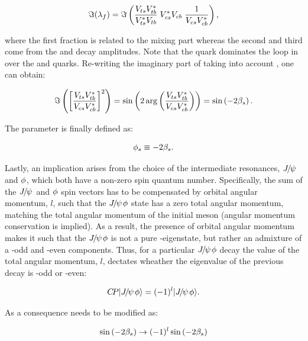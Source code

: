 \begin{equation}
  \centering
 \Im(\lambda_f) = \Im\parenthesis{ \frac{\Vts\Vtb^*}{\Vts^*\Vtb} \; \Vcs^*\Vcb \; \frac{1}{\Vcs\Vcb^*} },
 \label{lambdaf_ckm}
\end{equation}

\noindent where the first fraction is related to the mixing part \qoverp whereas the second and third come from
the \Bsb and \Bs decay amplitudes. Note that the \tquark quark dominates the loop in  over the
\cquark and \uquark quarks. Re-writing the imaginary part of  taking into account
, one can obtain:

\begin{equation}
  \centering
  \Im\parenthesis{ \brackets{ \frac{\Vts\Vtb^*}{\Vcs\Vcb^*}}^2 } =
  \sin \parenthesis{2 \arg \parenthesis{\frac{\Vts\Vtb^*}{\Vcs\Vcb^*}}} =
  \sin \parenthesis{-2\betas}.
 \label{lambda_ckm_manip}
\end{equation}

\noindent The parameter \phis is finally defined as:

\begin{equation}
  \centering
  \phis\equiv-2\betas.
 \label{phis_def}
\end{equation}

\noindent Lastly, an implication arises from the choice of the intermediate resonances, ${J\mskip -3mu/\mskip -2mu\psi\mskip 2mu}$ and $\phi$,
which both have a non-zero spin quantum number. Specifically, the sum of the ${J\mskip -3mu/\mskip -2mu\psi\mskip 2mu}$ and $\phi$ spin vectors
has to be compensated by orbital angular momentum, $l$, such that the ${J\mskip -3mu/\mskip -2mu\psi\mskip 2mu}\phi$ state has a zero total
angular momentum, matching the total angular momentum of the initial \Bs meson (angular momentum conservation is implied).
As a result, the presence of orbital angular momentum makes it such that the ${J\mskip -3mu/\mskip -2mu\psi\mskip 2mu}\phi$ is not a pure \CP-eigenstate,
but rather an admixture of a \CP-odd and \CP-even components. Thus, for a particular ${J\mskip -3mu/\mskip -2mu\psi\mskip 2mu}\phi$ decay the value of
the total angular momentum, $l$, dectates wheather the \CP eigenvalue of the previous decay is \CP-odd or \CP-even:

\begin{equation}
  \centering
  \CP\ket{\jpsi\Pphi} = (-1)^l\ket{\jpsi\Pphi}.
 \label{cp_eigenstates}
\end{equation}

\noindent As a consequence  needs to be modified as:

\begin{equation}
  \centering
  \sin \parenthesis{-2\betas} \to (-1)^l \sin \parenthesis{-2\betas}
 \label{phis_def}
\end{equation}

